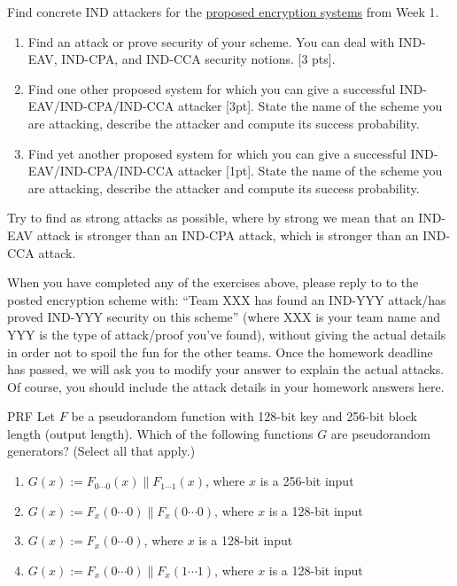 \documentclass[a4paper,10pt]{article}
\begin{document}

\begin{groupproject}{7}
Find concrete IND attackers for the \href{https://canvas.uva.nl/courses/10514/discussion_topics/76835?module_item_id=282332}{proposed encryption systems} from Week 1.
\begin{enumerate}
\item Find an attack or prove security of your scheme. You can deal with IND-EAV, IND-CPA, and IND-CCA security notions. [3 pts].
\item Find one other proposed system for which you can give a successful IND-EAV/IND-CPA/IND-CCA attacker [3pt]. State the name of the scheme you are attacking, describe the attacker and compute its success probability.
\item Find yet another proposed system for which you can give a successful IND-EAV/IND-CPA/IND-CCA attacker [1pt]. State the name of the scheme you are attacking, describe the attacker and compute its success probability.
\end{enumerate}
Try to find as strong attacks as possible, where by strong we mean that an IND-EAV attack is stronger than an IND-CPA attack, which is stronger than an IND-CCA attack.

When you have completed any of the exercises above, please reply to to the posted encryption scheme with: “Team XXX has found an IND-YYY attack/has proved IND-YYY security on this scheme” (where XXX is your team name and YYY is the type of attack/proof you’ve found), without giving the actual details in order not to spoil the fun for the other teams. Once the homework deadline has passed, we will ask you to modify your answer to explain the actual attacks.
Of course, you should include the attack details in your homework answers here.
\end{groupproject}
\begin{solution}
\end{solution}


\begin{nquestion}{1}{PRF}
Let $F$ be a pseudorandom function with 128-bit key and 256-bit block length (output length). Which of the following functions $G$ are pseudorandom generators? (Select all that apply.)
\begin{enumerate}
\item $G(x):=F_{0 \cdots 0}(x) \| F_{1\cdots 1}(x)$, where $x$ is a 256-bit input
\item $G(x):=F_x(0 \cdots 0) \| F_x(0 \cdots 0)$, where $x$ is a 128-bit input
\item $G(x):=F_x(0\cdots 0)$, where $x$ is a 128-bit input
\item $G(x):=F_x(0 \cdots 0) \| F_x(1 \cdots 1)$, where $x$ is a 128-bit input
\end{enumerate}
\end{nquestion}
\end{document}
